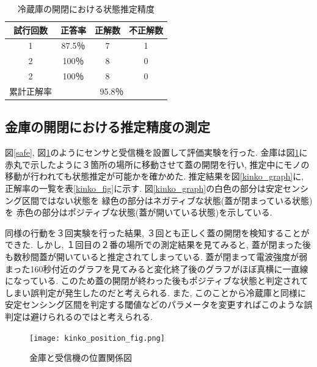\documentclass[Japanese]{dicomopapers}
\begin{document}
\begin{table}[htb]
    \begin{center}
        \caption{冷蔵庫の開閉における状態推定精度}
        \label{refrigerator_fig}
        \begin{tabular}{|c|c|c|c|} \hline
        試行回数 & 正答率 & 正解数 & 不正解数 \\ \hline
        1 & 87.5％ & 7 & 1 \\ \hline
        2 & 100％ & 8 & 0 \\ \hline
        2 & 100％ & 8 & 0 \\ \hline \hline
        累計正解率 & \multicolumn{3}{c|}{95.8％} \\ \hline
        \end{tabular}
    \end{center}
\end{table}



\subsection{金庫の開閉における推定精度の測定}
図\ref{safe}, 図\ref{kinko_position}のようにセンサと受信機を設置して評価実験を行った.
金庫は図\ref{kinko_position}に赤丸で示したように３箇所の場所に移動させて蓋の開閉を行い, 推定中にモノの移動が行われても状態推定が可能かを確かめた.
推定結果を図\ref{kinko_graph}に, 正解率の一覧を表\ref{kinko_fig}に示す.
図\ref{kinko_graph}の白色の部分は安定センシング区間ではない状態を 緑色の部分はネガティブな状態(蓋が閉まっている状態)を 赤色の部分はポジティブな状態(蓋が開いている状態)を示している.

同様の行動を３回実験を行った結果, ３回とも正しく蓋の開閉を検知することができた.
しかし, １回目の２番の場所での測定結果を見てみると, 蓋が閉まった後も数秒間蓋が開いていると推定されてしまっている.
蓋が閉まって電波強度が弱まった160秒付近のグラフを見てみると変化終了後のグラフがほぼ真横に一直線になっている.
このため蓋の開閉が終わった後もポジティブな状態と判定されてしまい誤判定が発生したのだと考えられる.
また, このことから冷蔵庫と同様に安定センシング区間を判定する閾値などのパラメータを変更すればこのような誤判定は避けられるのではと考えられる.

\begin{figure}[ht]
    \centering
    \texttt{[image: kinko\_position\_fig.png]}
    \caption{金庫と受信機の位置関係図}
    \label{kinko_position}
\end{figure}
\end{document}
